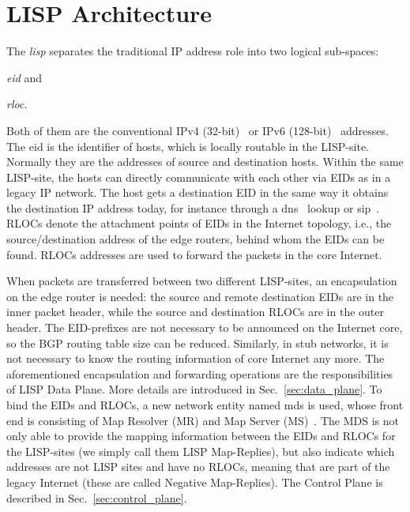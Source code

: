\section{LISP Architecture}
\label{sec:background_lisp}

The \emph{\acrfull{lisp}} separates the traditional IP address role into two logical sub-spaces:
\begin{inparaenum}[(i)]
	\item \emph{\acrfull{eid}} and
	\item \emph{\acrfull{rloc}}.
\end{inparaenum}
Both of them are the conventional IPv4 (32-bit)~\cite{rfc07911981internet} or IPv6 (128-bit)~\cite{deering1998rfc} addresses. The \acrshort{eid} is the identifier of hosts, which is locally routable in the LISP-site. Normally they are the addresses of source and destination hosts. Within the same LISP-site, the hosts can directly communicate with each other via EIDs as in a legacy IP network. The host gets a destination EID in the same way it obtains the destination IP address today, for instance through a \acrfull{dns}~\cite{mockapetrisrfc} lookup or \acrfull{sip}~\cite{rosenbergsip}. RLOCs denote the attachment points of EIDs in the Internet topology, i.e., the source/destination address of the edge routers, behind whom the EIDs can be found. RLOCs addresses are used to forward the packets in the core Internet. 

When packets are transferred between two different LISP-sites, an encapsulation on the edge router is needed: the source and remote destination EIDs are in the inner packet header, while the source and destination RLOCs are in the outer header. %
The EID-prefixes are not necessary to be announced on the Internet core, so the BGP routing table size can be reduced. Similarly, in stub networks, it is not necessary to know the routing information of core Internet any more. The aforementioned encapsulation and forwarding operations are the responsibilities of LISP Data Plane. More details are introduced in Sec.~\ref{sec:data_plane}. To bind the EIDs and RLOCs, a new network entity named \acrfull{mds} is used, whose front end is consisting of Map Resolver (MR) and Map Server (MS)~\cite{rfc6833}. The MDS is not only able to provide the mapping information between the EIDs and RLOCs for the LISP-sites (we simply call them LISP Map-Replies), but also indicate which addresses are not LISP sites and have no RLOCs, meaning that are part of the legacy Internet (these are called Negative Map-Replies). The Control Plane is described in Sec.~\ref{sec:control_plane}.


